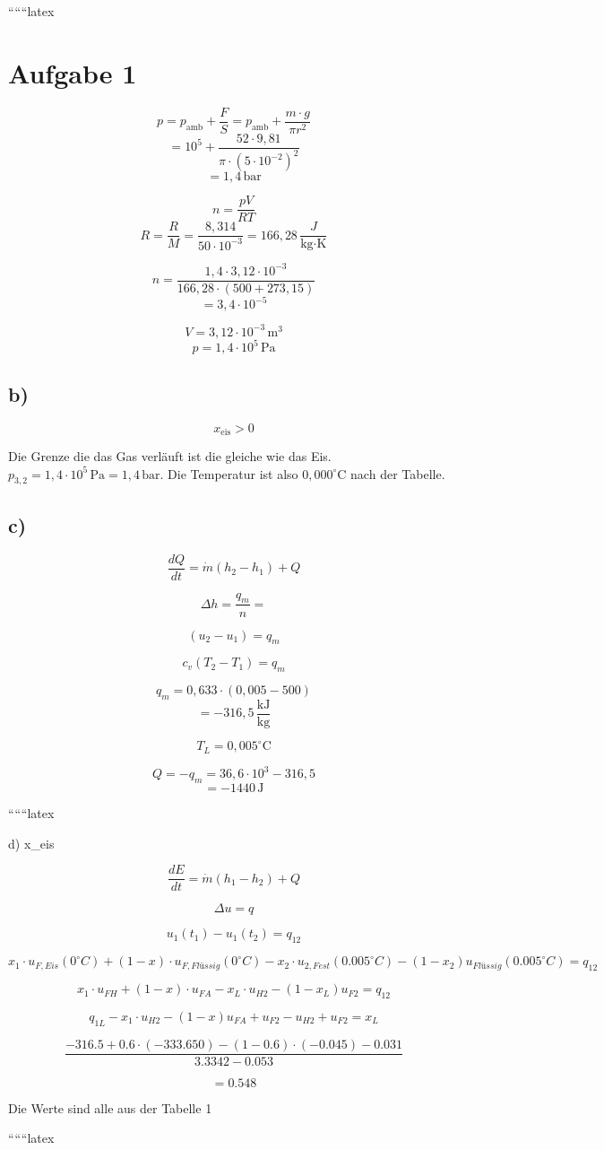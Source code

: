 
``````latex


\section*{Aufgabe 1}

\[ p = p_{\text{amb}} + \frac{F}{S} = p_{\text{amb}} + \frac{m \cdot g}{\pi r^2} \]
\[ = 10^5 + \frac{52 \cdot 9,81}{\pi \cdot (5 \cdot 10^{-2})^2} \]
\[ = 1,4 \, \text{bar} \]

\[ n = \frac{pV}{RT} \]
\[ R = \frac{R}{M} = \frac{8,314}{50 \cdot 10^{-3}} = 166,28 \, \frac{J}{\text{kg} \cdot \text{K}} \]

\[ n = \frac{1,4 \cdot 3,12 \cdot 10^{-3}}{166,28 \cdot (500 + 273,15)} \]
\[ = 3,4 \cdot 10^{-5} \]

\[ V = 3,12 \cdot 10^{-3} \, \text{m}^3 \]
\[ p = 1,4 \cdot 10^5 \, \text{Pa} \]

\subsection*{b)}

\[ x_{\text{eis}} > 0 \]

Die Grenze die das Gas verläuft ist die gleiche wie das Eis. \( p_{3,2} = 1,4 \cdot 10^5 \, \text{Pa} = 1,4 \, \text{bar} \). Die Temperatur ist also \( 0,000^\circ \text{C} \) nach der Tabelle.

\subsection*{c)}

\[ \frac{dQ}{dt} = \dot{m} (h_2 - h_1) + Q \]

\[ \Delta h = \frac{q_m}{n} = \]

\[ (u_2 - u_1) = q_m \]

\[ c_v (T_2 - T_1) = q_m \]

\[ q_m = 0,633 \cdot (0,005 - 500) \]
\[ = -316,5 \, \frac{\text{kJ}}{\text{kg}} \]

\[ T_L = 0,005^\circ \text{C} \]

\[ Q = -q_m = 36,6 \cdot 10^3 - 316,5 \]
\[ = -1440 \, \text{J} \]

``````latex


d) \quad x_{eis}

\[
\frac{dE}{dt} = \dot{m} (h_1 - h_2) + Q
\]

\[
\Delta u = q
\]

\[
u_1 (t_1) - u_1 (t_2) = q_{12}
\]

\[
x_1 \cdot u_{F, Eis} (0^\circ C) + (1 - x) \cdot u_{F, Flüssig} (0^\circ C) - x_2 \cdot u_{2, Fest} (0.005^\circ C) - (1 - x_2) u_{Flüssig} (0.005^\circ C) = q_{12}
\]

\[
x_1 \cdot u_{FH} + (1 - x) \cdot u_{FA} - x_L \cdot u_{H2} - (1 - x_L) u_{F2} = q_{12}
\]

\[
q_{1L} - x_1 \cdot u_{H2} - (1 - x) u_{FA} + u_{F2} - u_{H2} + u_{F2} = x_L
\]

\[
\frac{-316.5 + 0.6 \cdot (-333.650) - (1 - 0.6) \cdot (-0.045) - 0.031}{3.3342 - 0.053}
\]

\[
= 0.548
\]

Die Werte sind alle aus der Tabelle 1

``````latex


